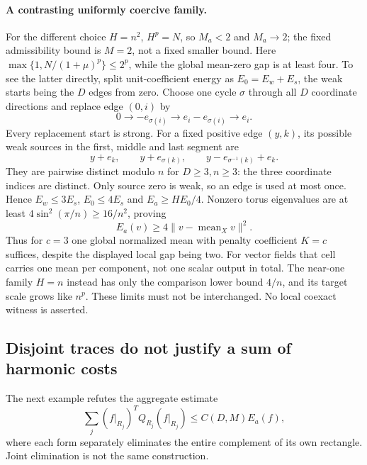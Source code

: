 \paragraph{A contrasting uniformly coercive family.}
For the different choice $H=n^2$, $H^p=N$, so $M_a<2$ and $M_a\to2$;
the fixed admissibility bound is $M=2$, not a fixed smaller bound. Here
$\max\{1,N/(1+\mu)^p\}\le2^p$, while the global mean-zero gap is at least
four. To see the latter directly, split unit-coefficient energy as
$E_0=E_w+E_s$, the weak starts being the $D$ edges from zero. Choose one
cycle $\sigma$ through all $D$ coordinate directions and replace edge
$(0,i)$ by
\[
 0\to-e_{\sigma(i)}\to e_i-e_{\sigma(i)}\to e_i.
\]
Every replacement start is strong. For a fixed positive edge $(y,k)$,
its possible weak sources in the first, middle and last segment are
\[
 y+e_k,\qquad y+e_{\sigma(k)},\qquad
 y-e_{\sigma^{-1}(k)}+e_k.
\]
They are pairwise distinct modulo $n$ for $D\ge3,n\ge3$: the three
coordinate indices are distinct. Only source zero is weak, so an edge is
used at most once. Hence $E_w\le3E_s$, $E_0\le4E_s$ and
$E_a\ge HE_0/4$. Nonzero torus eigenvalues are at least
$4\sin^2(\pi/n)\ge16/n^2$, proving
\[
 E_a(v)\ge4\|v-\operatorname{mean}_Xv\|^2.
\]
Thus for $c=3$ one global normalized mean with penalty coefficient $K=c$
suffices, despite the displayed local gap being two. For vector fields
that cell carries one mean per component, not one scalar output in total.
The near-one family $H=n$ instead has only the comparison lower bound
$4/n$, and its target scale grows like $n^p$. These limits must not be
interchanged. No local coexact witness is asserted.

\subsection{Disjoint traces do not justify a sum of harmonic costs}
The next example refutes the aggregate estimate
\begin{equation}\label{eq:boundary195-false-sum}
 \sum_j (f|_{R_j})^TQ_{R_j}(f|_{R_j})\le C(D,M)E_a(f),
\end{equation}
where each form separately eliminates the entire complement of its own
rectangle. Joint elimination is not the same construction.

